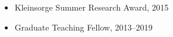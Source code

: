 \documentclass[12pt]{article}
\begin{document}
\begin{itemize}
\item[] Kleinsorge Summer Research Award, 2015
\item[] Graduate Teaching Fellow, 2013--2019
\end{itemize}







\end{document}
